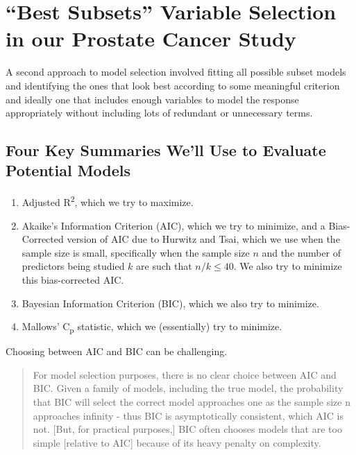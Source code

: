 \documentclass[]{book}
\providecommand{\tightlist}{%
  \setlength{\itemsep}{0pt}\setlength{\parskip}{0pt}}
\theoremstyle{definition}
\theoremstyle{definition}
\theoremstyle{definition}
\theoremstyle{remark}
\begin{document}
\chapter{\texorpdfstring{``Best Subsets'' Variable Selection in our
Prostate Cancer
Study}{Best Subsets Variable Selection in our Prostate Cancer Study}}\label{best-subsets-variable-selection-in-our-prostate-cancer-study}

A second approach to model selection involved fitting all possible
subset models and identifying the ones that look best according to some
meaningful criterion and ideally one that includes enough variables to
model the response appropriately without including lots of redundant or
unnecessary terms.

\section{Four Key Summaries We'll Use to Evaluate Potential
Models}\label{four-key-summaries-well-use-to-evaluate-potential-models}

\begin{enumerate}
\def\labelenumi{\arabic{enumi}.}
\tightlist
\item
  Adjusted R\textsuperscript{2}, which we try to maximize.
\item
  Akaike's Information Criterion (AIC), which we try to minimize, and a
  Bias-Corrected version of AIC due to Hurwitz and Tsai, which we use
  when the sample size is small, specifically when the sample size \(n\)
  and the number of predictors being studied \(k\) are such that
  \(n/k \leq 40\). We also try to minimize this bias-corrected AIC.
\item
  Bayesian Information Criterion (BIC), which we also try to minimize.
\item
  Mallows' C\textsubscript{p} statistic, which we (essentially) try to
  minimize.
\end{enumerate}

Choosing between AIC and BIC can be challenging.

\begin{quote}
For model selection purposes, there is no clear choice between AIC and
BIC. Given a family of models, including the true model, the probability
that BIC will select the correct model approaches one as the sample size
n approaches infinity - thus BIC is asymptotically consistent, which AIC
is not. {[}But, for practical purposes,{]} BIC often chooses models that
are too simple {[}relative to AIC{]} because of its heavy penalty on
complexity.
\end{quote}
\end{document}
